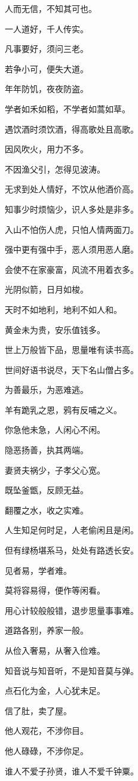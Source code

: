 \documentclass[12pt,oneside]{book}
\begin{document}
人而无信，不知其可也。

一人道好，千人传实。

凡事要好，须问三老。

若争小可，便失大道。

年年防饥，夜夜防盗。

学者如禾如稻，不学者如蒿如草。

遇饮酒时须饮酒，得高歌处且高歌。

因风吹火，用力不多。

不因渔父引，怎得见波涛。

无求到处人情好，不饮从他酒价高。

知事少时烦恼少，识人多处是非多。

入山不怕伤人虎，只怕人情两面刀。

强中更有强中手，恶人须用恶人磨。

会使不在家豪富，风流不用着衣多。

光阴似箭，日月如梭。

天时不如地利，地利不如人和。

黄金未为贵，安乐值钱多。

世上万般皆下品，思量唯有读书高。

世间好语书说尽，天下名山僧占多。

为善最乐，为恶难逃。

羊有跪乳之恩，鸦有反哺之义。

你急他未急，人闲心不闲。

隐恶扬善，执其两端。

妻贤夫祸少，子孝父心宽。

既坠釜甑，反顾无益。

翻覆之水，收之实难。

人生知足何时足，人老偷闲且是闲。

但有绿杨堪系马，处处有路透长安。

见者易，学者难。

莫将容易得，便作等闲看。

用心计较般般错，退步思量事事难。

道路各别，养家一般。

从俭入奢易，从奢入俭难。

知音说与知音听，不是知音莫与弹。

点石化为金，人心犹未足。

信了肚，卖了屋。

他人观花，不涉你目。

他人碌碌，不涉你足。

谁人不爱子孙贤，谁人不爱千钟粟。
\end{document}
